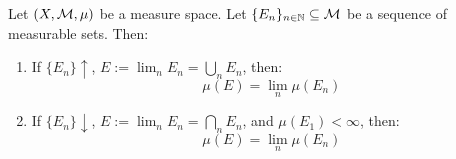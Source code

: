 \begin{ftheorem}
    Let $(X, \mathcal{M}, \mu)$ be a measure space. Let $\{E_n\}_{n \in \mathbb{N}} \subseteq \mathcal{M}$ be a sequence of
    measurable sets. Then:
    \vspace{1em}
    \begin{enumerate}[label=(\roman*)]
        \item If $\{E_n\} \uparrow$, $E := \lim_{n} E_n = \bigcup_{n} E_n$, then:
        $$\mu(E) = \lim_{n} \mu(E_n)$$
        \item If $\{E_n\} \downarrow$, $E := \lim_{n} E_n = \bigcap_{n} E_n$, and
        $\mu(E_1) < \infty$, then:
        $$\mu(E) = \lim_{n} \mu(E_n)$$
    \end{enumerate}
    
\end{ftheorem}

